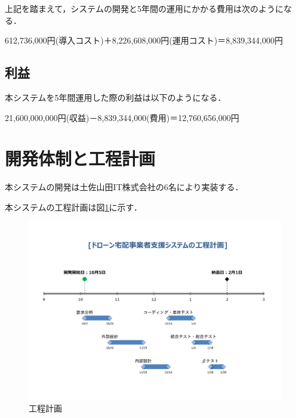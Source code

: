 \documentclass[a4paper, titlepage]{jsarticle}
\begin{document}
上記を踏まえて，システムの開発と5年間の運用にかかる費用は次のようになる．
\begin{center}
        612,736,000円(導入コスト)＋8,226,608,000円(運用コスト)＝8,839,344,000円
\end{center}

\subsection{利益}
本システムを5年間運用した際の利益は以下のようになる．
\begin{center}
        21,600,000,000円(収益)－8,839,344,000(費用)＝12,760,656,000円
\end{center}

\section{開発体制と工程計画}
本システムの開発は土佐山田IT株式会社の6名により実装する．

本システムの工程計画は図\ref{schedule}に示す．
\begin{figure}[htbp]
        \label{schedule}
        \centering
        \includegraphics[width=15cm]{schedule.pdf}
        \caption{工程計画}
\end{figure}
\end{document}
